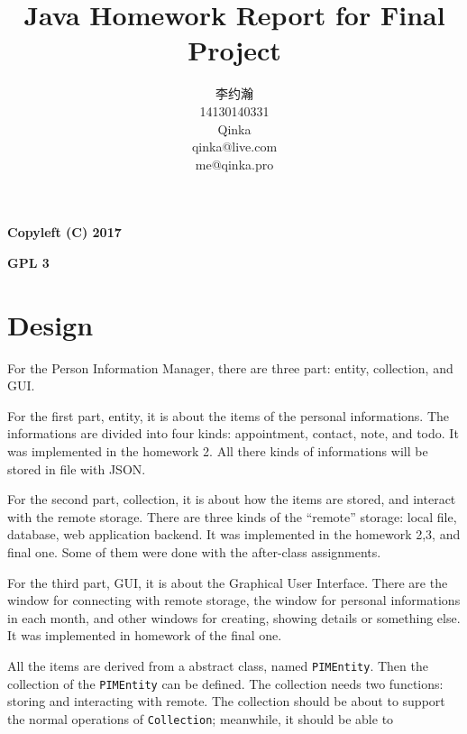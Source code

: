 \documentclass{article}
\title{Java Homework Report for Final Project}
\author{李约瀚 \\ 14130140331 \\ Qinka \\ qinka@live.com \\ me@qinka.pro}
\begin{document}
\maketitle
\newpage

{\Huge \textbf{Copyleft (C) 2017}}
\par
{\Huge \textbf{GPL 3}}
\newpage

\tableofcontents
\newpage

\section{Design}
\label{sec:design}

For the Person Information Manager, there are three part: entity, collection, and GUI.

For the first part, entity, it is about the items of the personal informations. The informations are divided into four kinds: appointment, contact, note, and todo.
It was implemented in the homework 2. All there kinds of informations will be stored in file with JSON.

For the second part, collection, it is about how the items are stored, and interact with the remote storage.
There are three kinds of the ``remote'' storage: local file, database, web application backend.
It was implemented in the homework 2,3, and final one. Some of them were done with the after-class assignments.

For the third part, GUI, it is about the Graphical User Interface. There are the window for connecting with remote storage, the window for personal informations
in each month, and other windows for creating, showing details or something else.
It was implemented in homework of the final one.

All the items are derived from a abstract class, named \lstinline|PIMEntity|. Then the collection of the \lstinline|PIMEntity| can be defined.
The collection needs two functions: storing and interacting with remote. The collection should be about to support the normal operations of \lstinline|Collection|; meanwhile, it should be able to 
\end{document}
